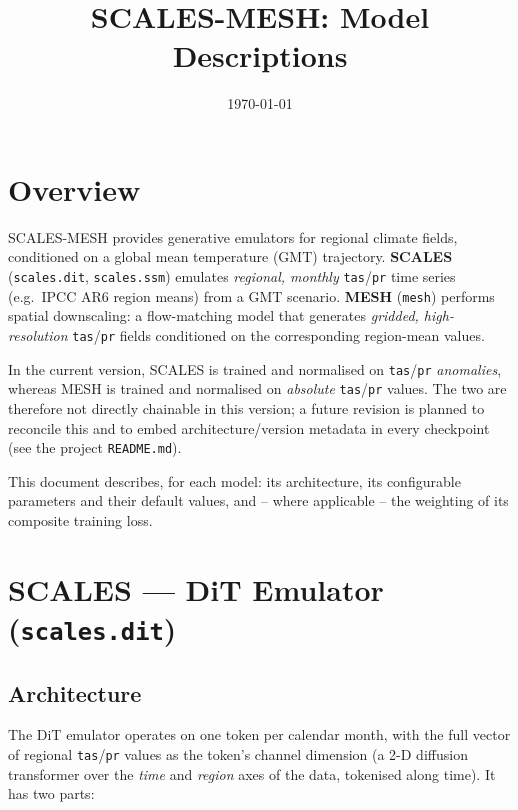 \documentclass[11pt]{article}
\title{SCALES-MESH: Model Descriptions}
\author{}
\date{\today}
\begin{document}
\maketitle
\tableofcontents

\section{Overview}

SCALES-MESH provides generative emulators for regional climate fields,
conditioned on a global mean temperature (GMT) trajectory. \textbf{SCALES}
(\texttt{scales.dit}, \texttt{scales.ssm}) emulates \emph{regional, monthly}
\texttt{tas}/\texttt{pr} time series (e.g.\ IPCC AR6 region means) from a GMT
scenario. \textbf{MESH} (\texttt{mesh}) performs spatial downscaling: a
flow-matching model that generates \emph{gridded, high-resolution}
\texttt{tas}/\texttt{pr} fields conditioned on the corresponding region-mean
values.

In the current version, SCALES is trained and normalised on \texttt{tas}/\texttt{pr}
\emph{anomalies}, whereas MESH is trained and normalised on \emph{absolute}
\texttt{tas}/\texttt{pr} values. The two are therefore not directly chainable
in this version; a future revision is planned to reconcile this and to embed
architecture/version metadata in every checkpoint (see the project
\texttt{README.md}).

This document describes, for each model: its architecture, its
configurable parameters and their default values, and -- where applicable
-- the weighting of its composite training loss.

\clearpage
\section{SCALES --- DiT Emulator (\texttt{scales.dit})}

\subsection{Architecture}

The DiT emulator operates on one token per calendar month, with the full
vector of regional \texttt{tas}/\texttt{pr} values as the token's channel
dimension (a 2-D diffusion transformer over the \emph{time} and
\emph{region} axes of the data, tokenised along time). It has two parts:
\end{document}
